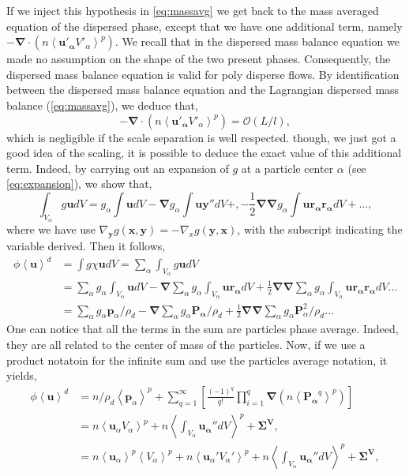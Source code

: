 If we inject this hypothesis in \ref{eq:massavg} we get back to the mass averaged equation of the dispersed phase, except that we have one additional term, namely $- \bm{\nabla}\cdot(n\left<\bm{u'_\alpha}V'_\alpha\right>^p)$.
We recall that in the dispersed mass balance equation we made no assumption on the shape of the two present phases. 
Consequently, the dispersed mass balance equation is valid for poly disperse flows. 
By identification between the dispersed mass balance equation and the Lagrangian dispersed mass balance (\ref{eq:massavg}), we deduce that,
\begin{equation}
    - \bm{\nabla}\cdot(n\left<\bm{u'_\alpha}V'_\alpha\right>^p)
    = \mathcal{O}\left(L/l\right),
\end{equation}
which is negligible if the scale separation is well respected.
though, we just got a good idea of the scaling, it is possible to deduce the exact value of this additional term.
Indeed, by carrying out an expansion of $g$ at a particle center $\alpha$ (see \ref{eq:expansion}), we show that,
\begin{equation}
    \int_{V_\alpha} g \bm{u} dV 
    = g_\alpha \int \bm{u} dV 
    - \bm{\nabla} g_\alpha \int \bm{uy''}dV + ,
    - \frac{1}{2}\bm{\nabla\nabla} g_\alpha \int \bm{u\bm{r}_\alpha\bm{r}_\alpha}dV + \ldots,
\end{equation}
where we have use $\nabla_{\bm{y}} g(\bm{x},\bm{y}) = - \nabla_x g(\bm{y},\bm{x})$, with the subscript indicating the variable derived.  
Then it follows,
\begin{align}
    \phi\left<\bm{u}\right>^d 
    &= \int g\chi \bm{u}dV 
    = \sum_\alpha \int_{V_\alpha} g \bm{u} dV \\
    &= \sum_\alpha g_\alpha \int_{V_\alpha} \bm{u} dV 
    - \bm{\nabla} \sum_\alpha g_\alpha \int_{V_\alpha} \bm{u\bm{r}_\alpha} dV 
    + \frac{1}{2}\bm{\nabla\nabla} \sum_\alpha g_\alpha \int_{V_\alpha} \bm{u\bm{r}_\alpha\bm{r}_\alpha} dV \ldots\\
    &= \sum_\alpha g_\alpha \bm{p}_\alpha/\rho_d 
    - \bm{\nabla} \sum_\alpha g_\alpha \bm{P_\alpha}/\rho_d 
    + \frac{1}{2}\bm{\nabla\nabla} \sum_\alpha g_\alpha  \bm{P}_\alpha^2/\rho_d \ldots
\end{align}
One can notice that all the terms in the sum are particles phase average. 
Indeed, they are all related to the center of mass of the particles.
Now, if we use a product notatoin for the infinite sum and use the particles average notation,
it yields,
\begin{align}
    \phi\left<\bm{u}\right>^d 
    &= n/\rho_d\left<\bm{p}_\alpha\right>^p
    + \sum_{q=1}^\infty \left[\frac{(-1)^q}{q!} \prod^q_{i=1}\bm{\nabla} (n\left< \bm{P_\alpha}^q\right>^p)\right]\\
    &= n\left<\bm{u}_\alpha V_\alpha\right>^p
    + n\left<\int_{V_\alpha} \bm{u_\alpha''}dV\right>^p 
    + \bm{\Sigma^V},\\
    &= n\left<\bm{u}_\alpha\right>^p \left<V_\alpha\right>^p
    + n\left<\bm{u}_\alpha' V_\alpha'\right>^p
    + n\left<\int_{V_\alpha} \bm{u_\alpha''}dV\right>^p 
    + \bm{\Sigma^V},
    \label{eq:exp}
\end{align}
